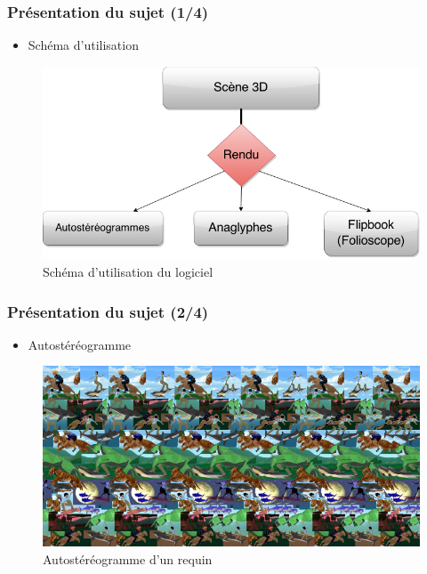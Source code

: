 \documentclass{beamer}
\begin{document}


\begin{frame}

\frametitle{Présentation du sujet (1/4)}

\begin{itemize}[label=$\bullet$]
\item Schéma d'utilisation
\end{itemize}
\begin{figure}
\centering
\includegraphics[scale=0.35]{schema.png} %
\caption{Schéma d'utilisation du logiciel}
\end{figure}

\end{frame}


\begin{frame}

\frametitle{Présentation du sujet (2/4)}

\begin{itemize}[label=$\bullet$]
\item Autostéréogramme
\end{itemize}
\begin{figure}
\centering
\includegraphics[scale=0.4]{autostereog.png} %
\caption{Autostéréogramme d'un requin \footnotemark}
\end{figure}

\end{frame}
\end{document}
